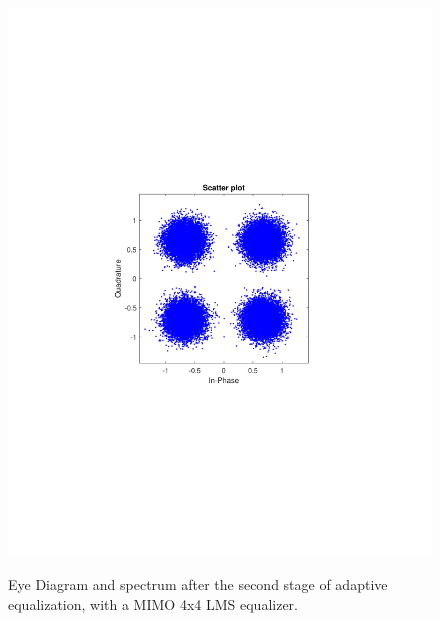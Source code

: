 \begin{refsection}
\begin{figure}[H]
\begin{minipage}{0.30\textwidth}
		\includegraphics[clip, trim=4cm 8cm 4cm 8cm, width=1\textwidth]{./sdf/m_qam_system/figures/expResults/intradyne/6_const_4GBdInSig13dB_AfMIMO2.pdf}
		\label{fig:4GBdSpecBefFec}
	\end{minipage}
	\caption{Eye Diagram and spectrum after the second stage of adaptive equalization, with a MIMO 4x4 LMS equalizer.}
\end{figure}


\end{refsection}
